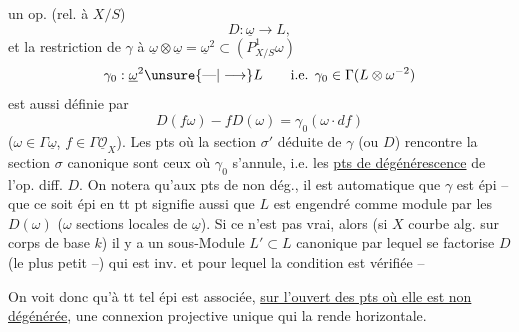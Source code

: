 un op.  (rel. à $X/S$)
\[
D:\underline{\omega}\longrightarrow L,
\]
et la restriction de $\gamma$ à $\underline{\omega}\otimes\underline{\omega}=\underline{\omega}^2\subset(P^1_{X/S}\omega)$
\[
\gamma_0:\underline{\omega}^2\unsure{\text{---}|\longrightarrow}L\qquad\text{i.e. }\gamma_0\in\Gamma(L\otimes\omega^{-2})
\]
est aussi définie par
\[
D(f\omega)-fD(\omega)=\gamma_0(\omega\cdot df)
\]
($\omega\in\Gamma\underline{\omega}$, $f\in\Gamma\underline{\mathcal{O}}_X$). Les pts où la section $\sigma'$ déduite de $\gamma$ (ou $D$) rencontre la section $\sigma$ canonique sont ceux où $\gamma_0$ s'annule, i.e. les \uline{pts de dégénérescence} de l'op. diff. $D$. On notera qu'aux pts de non dég., il est automatique que $\gamma$ est épi -- que ce soit épi en tt pt signifie aussi que $L$ est engendré comme module par les $D(\omega)$ ($\omega$ sections locales de $\underline{\omega}$). Si ce n'est pas vrai, alors (si $X$ courbe alg. sur corps de base $k$) il y a un sous-Module $L'\subset L$ canonique par lequel se factorise $D$ (le plus petit --) qui est inv. et pour lequel la condition est vérifiée --

On voit donc qu'à tt tel épi est associée, \uline{sur l'ouvert des pts où elle est non dégénérée}, une connexion projective  unique qui la rende horizontale. 
